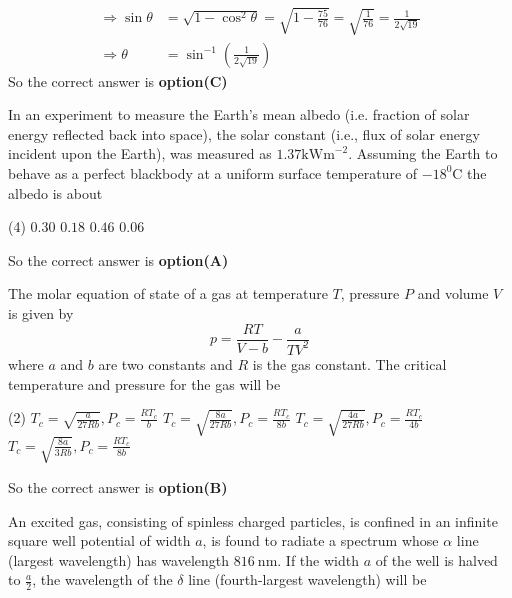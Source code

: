 \begin{questions}
\begin{answer}
\begin{align*}
	\Rightarrow \sin \theta&=\sqrt{1-\cos ^{2} \theta}=\sqrt{1-\frac{75}{76}}=\sqrt{\frac{1}{76}}=\frac{1}{2 \sqrt{19}} \\
	\Rightarrow \theta&=\sin ^{-1}\left(\frac{1}{2 \sqrt{19}}\right)
	\end{align*}
		So the correct answer is \textbf{option(C)}
\end{answer}
\begin{minipage}{\textwidth}
	\question In an experiment to measure the Earth's mean albedo (i.e. fraction of solar energy reflected back into space), the solar constant (i.e., flux of solar energy incident upon the Earth), was measured as $1.37 \mathrm{kWm}^{-2}$. Assuming the Earth to behave as a perfect blackbody at a uniform surface temperature of $-18^{0} \mathrm{C}$ the albedo is about
\end{minipage}
\begin{tasks}(4)
	\task[\textbf{A.}] $0.30$
	\task[\textbf{B.}] $0.18$
	\task[\textbf{C.}] $0.46$
	\task[\textbf{D.}] $0.06$
\end{tasks}
\begin{answer}
	So the correct answer is \textbf{option(A)}
\end{answer}
\begin{minipage}{\textwidth}
	\question The molar equation of state of a gas at temperature $T$, pressure $P$ and volume $V$ is given by
	$$
	p=\frac{R T}{V-b}-\frac{a}{T V^{2}}
	$$
	where $a$ and $b$ are two constants and $R$ is the gas constant. The critical temperature and pressure for the gas will be
\end{minipage}
\begin{tasks}(2)
	\task[\textbf{A.}] $T_{c}=\sqrt{\frac{a}{27 R b}}, P_{c}=\frac{R T_{c}}{b}$
	\task[\textbf{B.}] $T_{c}=\sqrt{\frac{8 a}{27 R b}}, P_{c}=\frac{R T_{c}}{8 b}$
	\task[\textbf{C.}] $T_{c}=\sqrt{\frac{4 a}{27 R b}}, P_{c}=\frac{R T_{c}}{4 b}$
	\task[\textbf{D.}] $T_{c}=\sqrt{\frac{8 a}{3 R b}}, P_{c}=\frac{R T_{c}}{8 b}$
\end{tasks}
\begin{answer}
	So the correct answer is \textbf{option(B)}
\end{answer}
\begin{minipage}{\textwidth}
	\question An excited gas, consisting of spinless charged particles, is confined in an infinite square well potential of width $a$, is found to radiate a spectrum whose $\alpha$ line (largest wavelength) has wavelength $816 \mathrm{~nm}$. If the width $a$ of the well is halved to $\frac{a}{2}$, the wavelength of the $\delta$ line (fourth-largest wavelength) will be

\end{minipage}
\end{questions}

